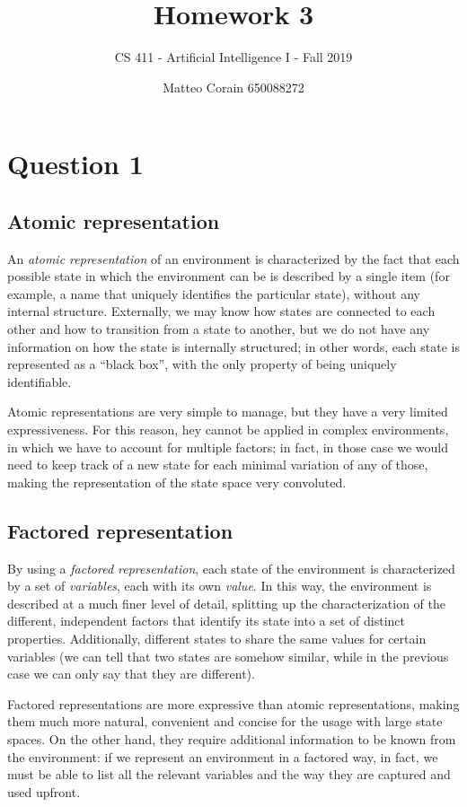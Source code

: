 \documentclass[letterpaper,headings=standardclasses]{scrartcl}
\title{Homework 3}
\subtitle{CS 411 - Artificial Intelligence I - Fall 2019}
\author{Matteo Corain 650088272}
\begin{document}
\maketitle

\section{Question 1}

\subsection{Atomic representation}

An \emph{atomic representation} of an environment is characterized by the fact that each possible state in which the environment can be is described by a single item (for example, a name that uniquely identifies the particular state), without any internal structure. Externally, we may know how states are connected to each other and how to transition from a  state to another, but we do not have any information on how the state is internally structured; in other words, each state is represented as a “black box”, with the only property of being uniquely identifiable.

Atomic representations are very simple to manage, but they have a very limited expressiveness. For this reason, hey cannot be applied in complex environments, in which we have to account for multiple factors; in fact, in those case we would need to keep track of a new state for each minimal variation of any of those, making the representation of the state space very convoluted.

\subsection{Factored representation}

By using a \emph{factored representation}, each state of the environment is characterized by a set of \emph{variables}, each with its own \emph{value}. In this way, the environment is described at a much finer level of detail, splitting up the characterization of the different, independent factors that identify its state into a set of distinct properties. Additionally, different states to share the same values for certain variables (we can tell that two states are somehow similar, while in the previous case we can only say that they are different).

Factored representations are more expressive than atomic representations, making them much more natural, convenient and concise for the usage with large state spaces. On the other hand, they require additional information to be known from the environment: if we represent an environment in a factored way, in fact, we must be able to list all the relevant variables and the way they are captured and used upfront.
\end{document}

